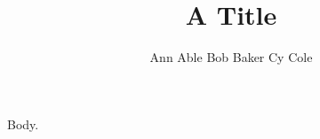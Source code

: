\title{A Title}
\author{Ann Able \quad Bob Baker \quad Cy Cole}
\maketitle
\address{Center for Theory, Univ A, Town, Country}
Body.

